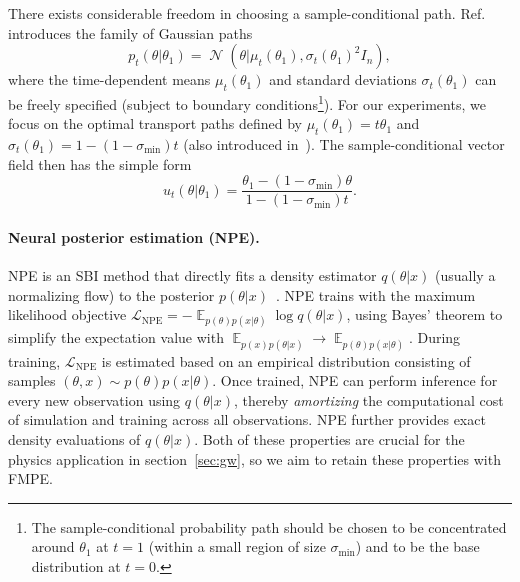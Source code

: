\documentclass{article}
\theoremstyle{remark}
\DeclareMathOperator{\Ex}{\ensuremath{\mathbb{E}}}
\DeclareMathOperator{\N}{\mathcal{N}}
\begin{document}
There exists considerable freedom in choosing a sample-conditional path. Ref.~\citep{flow_matching} introduces the family of Gaussian paths
\begin{equation}\label{eq:sample-conditional-path}
    p_t(\theta|\theta_1) = \N(\theta|\mu_t(\theta_1),\sigma_t(\theta_1)^2I_n),
\end{equation}
where the time-dependent means $\mu_t(\theta_1)$ and standard deviations $\sigma_t(\theta_1)$ can be freely specified (subject to boundary conditions\footnote{The sample-conditional probability path should be chosen to be concentrated around $\theta_1$ at $t=1$ (within a small region of size $\sigma_{\text{min}}$) and to be the base distribution at $t=0$.}). For our experiments, we focus on the optimal transport paths defined by $\mu_t(\theta_1)=t\theta_1$ and $\sigma_t(\theta_1)=1-(1-\sigma_{\min})t$ (also introduced in~\citep{flow_matching}). The sample-conditional vector field then has the simple form
\begin{equation}\label{eq:sample-conditional-vector-field}
    u_t(\theta|\theta_1) = \frac{\theta_1 - (1 - \sigma_\text{min})\theta}{1 - (1 - \sigma_\text{min})t}.
\end{equation}




\paragraph{Neural posterior estimation (NPE).} NPE is an SBI method that directly fits a density estimator $q(\theta|x)$ (usually a normalizing flow) to the posterior $p(\theta|x)$~\cite{papamakarios2016fast,lueckmann2017flexible,greenberg2019automatic}. NPE trains with the maximum likelihood objective $\mathcal{L}_\text{NPE} = -\Ex_{p(\theta)p(x|\theta)}\log q(\theta|x)$, using Bayes' theorem to simplify the expectation value with $\Ex_{p(x)p(\theta|x)} \to \Ex_{p(\theta)p(x|\theta)}$. During training, $\mathcal{L}_\text{NPE}$ is estimated based on an empirical distribution consisting of samples $(\theta,x)\sim p(\theta)p(x|\theta)$. Once trained, NPE can perform inference for every new observation using $q(\theta|x)$, thereby \emph{amortizing} the computational cost of simulation and training across all observations. NPE further provides exact density evaluations of $q(\theta|x)$. Both of these properties are crucial for the physics application in section~\ref{sec:gw}, so we aim to retain these properties with FMPE.
\end{document}
